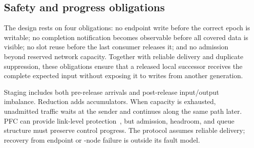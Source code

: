 \subsection{Safety and progress obligations}
The design rests on four obligations: no endpoint write before the correct epoch is writable; no completion notification becomes observable before all covered data is visible; no slot reuse before the last consumer releases it; and no admission beyond reserved network capacity. Together with reliable delivery and duplicate suppression, these obligations ensure that a released local successor receives the complete expected input without exposing it to writes from another generation.

Staging includes both pre-release arrivals and post-release input/output imbalance. Reduction adds accumulators. When capacity is exhausted, unadmitted traffic waits at the sender and continues along the same path later. PFC can provide link-level protection~\cite{pfc}, but admission, headroom, and queue structure must preserve control progress. The protocol assumes reliable delivery; recovery from endpoint or \sys{}-node failure is outside its fault model.

